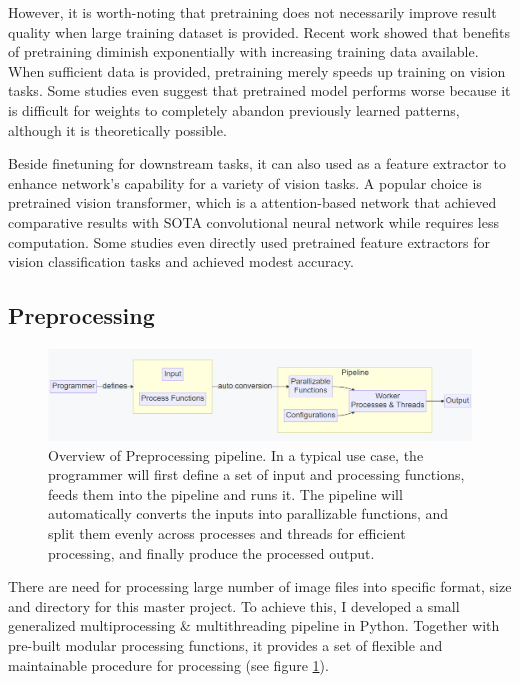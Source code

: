 However, it is worth-noting that pretraining does not necessarily improve result quality when large training dataset is provided. Recent work showed that benefits of pretraining diminish exponentially with increasing training data available. When sufficient data is provided, pretraining merely speeds up training on vision tasks\cite{heRethinkingImageNetPretraining2018}. Some studies even suggest that pretrained model performs worse because it is difficult for weights to completely abandon previously learned patterns, although it is theoretically possible\cite{el-noubyAreLargescaleDatasets2021}. 

Beside finetuning for downstream tasks, it can also used as a feature extractor to enhance network's capability for a variety of vision tasks. A popular choice is pretrained vision transformer\cite{dosovitskiyImageWorth16x162021}, which is a attention-based network that achieved comparative results with SOTA convolutional neural network while requires less computation. Some studies even directly used pretrained feature extractors for vision classification tasks and achieved modest accuracy\cite{awaisCanPretrainedConvolutional2020}.


\subsection{Preprocessing}

\begin{figure}
    \centering
    \includegraphics[width=1.0\textwidth]{images/introduction/preprocess_pipeline.png}
    \caption{Overview of Preprocessing pipeline. In a typical use case, the programmer will first define a set of input and processing functions, feeds them into the pipeline and runs it. The pipeline will automatically converts the inputs into parallizable functions, and split them evenly across processes and threads for efficient processing, and finally produce the processed output.} 
    \label{fig:preprocess_pipeline}
\end{figure}

There are need for processing large number of image files into specific format, size and directory for this master project. To achieve this, I developed a small generalized multiprocessing \& multithreading pipeline in Python\cite{WelcomePythonOrg}. Together with pre-built modular processing functions, it provides a set of flexible and maintainable procedure for processing (see figure \ref{fig:preprocess_pipeline}).


